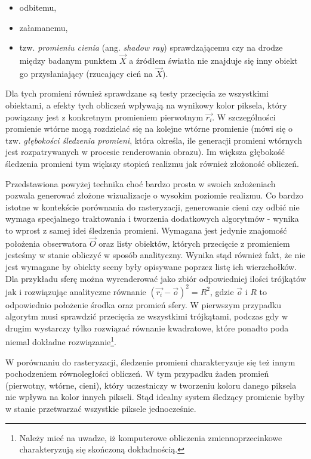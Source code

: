 \begin{itemize}
\item odbitemu,
\item załamanemu,
\item tzw. \textit{promieniu cienia} (ang. \textit{shadow ray}) sprawdzającemu czy na drodze między badanym punktem $\vec{X}$ a źródłem światła nie znajduje się inny obiekt go przysłaniający (rzucający cień na $\vec{X}$).
\end{itemize}
Dla tych promieni również sprawdzane są testy przecięcia ze wszystkimi obiektami, a efekty tych obliczeń wpływają na wynikowy kolor piksela, który powiązany jest z konkretnym promieniem pierwotnym $\vec{r_i}$. W szczególności promienie wtórne mogą rozdzielać się na kolejne wtórne promienie (mówi się o tzw. \textit{głębokości śledzenia promieni}, która określa, ile generacji promieni wtórnych jest rozpatrywanych w procesie renderowania obrazu). Im większa głębokość śledzenia promieni tym większy stopień realizmu jak również złożoność obliczeń.

Przedstawiona powyżej technika choć bardzo prosta w swoich założeniach pozwala generować złożone wizualizacje o wysokim poziomie realizmu. Co bardzo istotne w kontekście porównania do rasteryzacji, generowanie cieni czy odbić nie wymaga specjalnego traktowania i tworzenia dodatkowych algorytmów - wynika to wprost z samej idei śledzenia promieni. Wymagana jest jedynie znajomość położenia obserwatora $\vec{O}$ oraz listy obiektów, których przecięcie z promieniem jesteśmy w stanie obliczyć w sposób analityczny. Wynika stąd również fakt, że nie jest wymagane by obiekty sceny były opisywane poprzez listę ich wierzchołków. Dla przykładu sferę można wyrenderować jako zbiór odpowiedniej ilości trójkątów jak i rozwiązując analityczne równanie $(\vec{r_i} - \vec{o})^2 = R^2$, gdzie $\vec{o}$ i $R$ to odpowiednio położenie środka oraz promień sfery. W pierwszym przypadku algorytm musi sprawdzić przecięcia ze wszystkimi trójkątami, podczas gdy w drugim wystarczy tylko rozwiązać równanie kwadratowe, które ponadto poda niemal dokładne rozwiązanie\footnote{Należy mieć na uwadze, iż komputerowe obliczenia zmiennoprzecinkowe charakteryzują się skończoną dokładnością.}. 

W porównaniu do rasteryzacji, śledzenie promieni charakteryzuje się też innym pochodzeniem równoległości obliczeń. W tym przypadku żaden promień (pierwotny, wtórne, cieni), który uczestniczy w tworzeniu koloru danego piksela nie wpływa na kolor innych pikseli. Stąd idealny system śledzący promienie byłby w stanie przetwarzać wszystkie piksele jednocześnie.

